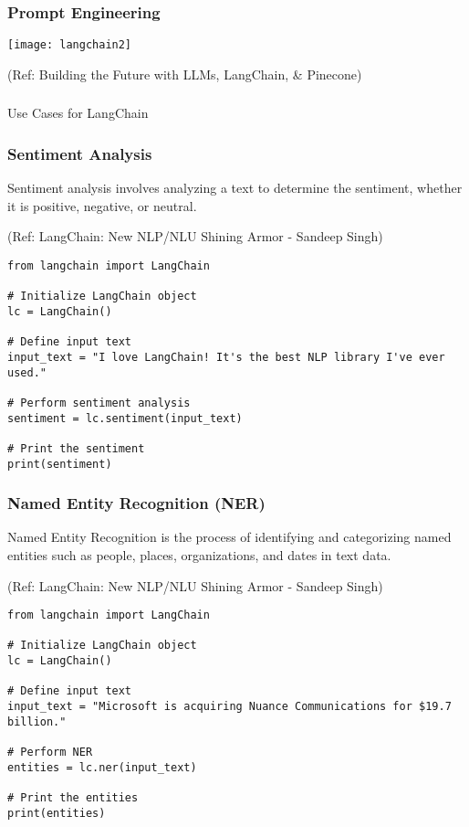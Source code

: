 \begin{frame}\frametitle{Prompt Engineering}

\begin{center}
\texttt{[image: langchain2]}
\end{center}	  

{\tiny (Ref: Building the Future with LLMs, LangChain, \& Pinecone)}
\end{frame}

\begin{frame}[fragile]\frametitle{}
\begin{center}
{\Large Use Cases for LangChain}
\end{center}
\end{frame}


\begin{frame}[fragile]\frametitle{Sentiment Analysis}

Sentiment analysis involves analyzing a text to determine the sentiment, whether it is positive, negative, or neutral. 

{\tiny (Ref: LangChain: New NLP/NLU Shining Armor - Sandeep Singh)}

\begin{lstlisting}
from langchain import LangChain

# Initialize LangChain object
lc = LangChain()

# Define input text
input_text = "I love LangChain! It's the best NLP library I've ever used."

# Perform sentiment analysis
sentiment = lc.sentiment(input_text)

# Print the sentiment
print(sentiment)
\end{lstlisting}	  

\end{frame}


\begin{frame}[fragile]\frametitle{Named Entity Recognition (NER)}

Named Entity Recognition is the process of identifying and categorizing named entities such as people, places, organizations, and dates in text data.

{\tiny (Ref: LangChain: New NLP/NLU Shining Armor - Sandeep Singh)}

\begin{lstlisting}
from langchain import LangChain

# Initialize LangChain object
lc = LangChain()

# Define input text
input_text = "Microsoft is acquiring Nuance Communications for $19.7 billion."

# Perform NER
entities = lc.ner(input_text)

# Print the entities
print(entities)
\end{lstlisting}	  

\end{frame}

